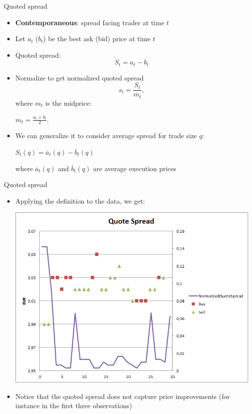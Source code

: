 \documentclass[english,10pt]{beamer}
\begin{document}
\begin{frame}{Quoted spread}
	\begin{itemize}
		\item \textbf{Contemporaneous}: spread facing trader at time $t$
		\item Let $a_t$ ($b_t$) be the best ask (bid) price at time $t$
		\item \alert{Quoted spread}:
		\[
		S_t = a_t -b_t
		\]
		\item Normalize to get \alert{normalized quoted spread}
		\[
		s_t = \frac{S_t}{m_t},
		\]
		where $m_t$ is the midprice:
		\begin{center}
			$
			m_t = \frac{a_t+b_t}{2}.
			$
		\end{center}
		\item We can generalize it to consider average spread for trade size $q$: 
		\begin{center}$S_t(q)=\overline{a}_t(q)-\overline{b}_t(q)$\end{center}
		where $\overline{a}_t(q)$ and $\overline{b}_t(q)$ are average execution prices
	\end{itemize}
\end{frame}


\begin{frame}{Quoted spread}
	\begin{itemize}
		\item Applying the definition to the data, we get:
		\begin{center}	
			\includegraphics[scale=0.35]{pics/L2_quotespread}
		\end{center}
		\item Notice that the quoted spread does not capture price improvements (for instance in the first three observations)
	\end{itemize}
\end{frame}
\end{document}
